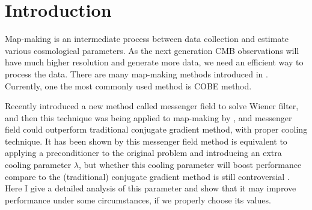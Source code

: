 \documentclass[twocolumn,linenumbers]{aastex631}
\begin{document}
\section{Introduction} \label{sec:intro}


Map-making is an intermediate process between data collection and estimate
various cosmological parameters.
As the next generation CMB observations will have much higher resolution and 
generate more data, we need an efficient way to process the data.
There are many map-making methods introduced in \cite{1997ApJ...480L..87T}.
Currently, one the most commonly used method is COBE method.

Recently \cite{2013A&A...549A.111E} introduced a new
method called messenger field to solve Wiener filter,
and then this technique was being applied to map-making by
\cite{Huffenberger_2018},
and messenger field could outperform traditional conjugate gradient method, 
with proper cooling technique.
It has been shown by \cite{2018A&A...620A..59P} this messenger field method
is equivalent to applying a preconditioner to the original problem and 
introducing an extra cooling parameter $\lambda$,
but whether this cooling parameter will boost performance compare to
 the (traditional) conjugate gradient method is still controversial . 
Here I give a detailed analysis of this parameter and show that
it may improve performance under some circumstances, if we properly choose
its values.
\end{document}
